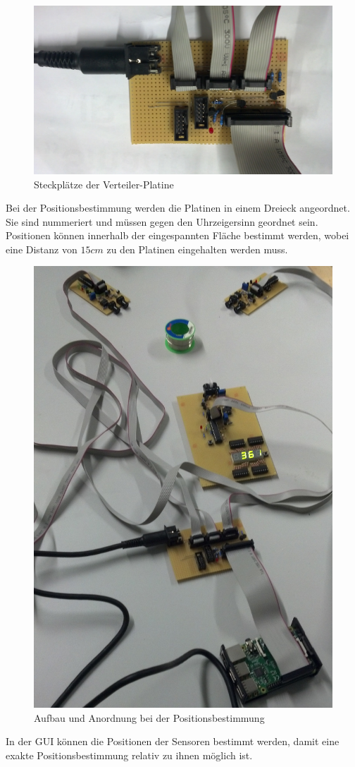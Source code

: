 \begin{figure}[H]
	\centering
	\includegraphics[width=(\textwidth), angle=0]{fotos/verteiler.jpg}
	\caption{Steckplätze der Verteiler-Platine} \label{p:2}
\end{figure}
Bei der Positionsbestimmung werden die Platinen in einem Dreieck angeordnet. Sie sind nummeriert und müssen gegen den Uhrzeigersinn geordnet sein. Positionen können innerhalb der eingespannten Fläche bestimmt werden, wobei eine Distanz von $15cm$ zu den Platinen eingehalten werden muss. \\
\begin{figure}[h]
	\centering
	\includegraphics[width=(\textwidth), angle=0]{fotos/aufbau.jpg}
	\caption{Aufbau und Anordnung bei der Positionsbestimmung} \label{p:3}
\end{figure}
In der GUI können die Positionen der Sensoren bestimmt werden, damit eine exakte Positionsbestimmung relativ zu ihnen möglich ist.